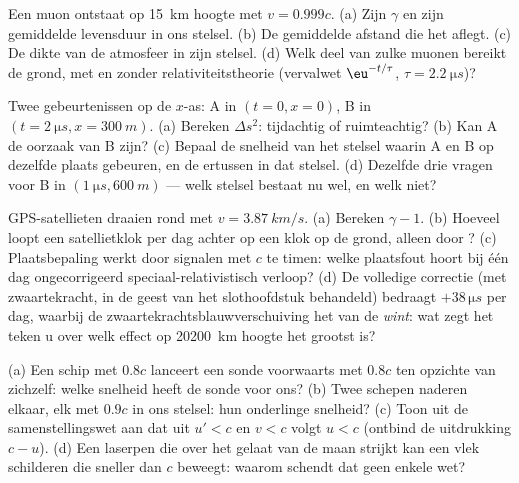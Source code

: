 \begin{exercise}[$\star$]\label{exo:b3:relativistic-kinematics:3}
Een muon ontstaat op \qty{15}{km} hoogte met $v = 0.999c$. (a) Zijn
$\gamma$ en zijn gemiddelde levensduur in ons stelsel. (b) De gemiddelde
afstand die het aflegt. (c) De dikte van de atmosfeer in zijn stelsel.
(d) Welk deel van zulke muonen bereikt de grond, met en zonder
relativiteitstheorie (vervalwet $\eu^{-t/\tau}$, $\tau = \qty{2.2}{\micro s}$)?
\end{exercise}

\begin{exercise}[$\star$]\label{exo:b3:relativistic-kinematics:4}
Twee gebeurtenissen op de $x$-as: A in $(t = 0, x = 0)$, B in $(t =
\qty{2}{\micro s}, x = \qty{300}{m})$. (a) Bereken $\Delta s^2$:
tijdachtig of ruimteachtig? (b) Kan A de oorzaak van B zijn? (c) Bepaal de
snelheid van het stelsel waarin A en B op dezelfde plaats gebeuren, en de
 ertussen in dat stelsel. (d) Dezelfde drie vragen voor B in
$(\qty{1}{\micro s}, \qty{600}{m})$ --- welk stelsel bestaat nu wel, en
welk niet?
\end{exercise}

\begin{exercise}[$\star\star$]\label{exo:b3:relativistic-kinematics:5}
GPS-satellieten draaien rond met $v = \qty{3.87}{km/s}$. (a) Bereken
$\gamma -
1$. (b) Hoeveel loopt een satellietklok per dag achter op een
klok op de grond, alleen door ? (c) Plaatsbepaling werkt door
signalen met $c$ te timen: welke plaatsfout hoort bij één dag ongecorrigeerd
speciaal-relativistisch verloop? (d) De volledige correctie (met
zwaartekracht, in de geest van het slothoofdstuk behandeld) bedraagt
$+38\,\unit{\micro s}$ per dag, waarbij de zwaartekrachtsblauwverschuiving
het van de  \emph{wint}: wat zegt het teken u over welk effect op
\qty{20200}{km} hoogte het grootst is?
\end{exercise}

\begin{exercise}[$\star\star$]\label{exo:b3:relativistic-kinematics:6}
(a) Een schip met $0.8c$ lanceert een sonde voorwaarts met $0.8c$ ten
opzichte van zichzelf: welke snelheid heeft de sonde voor ons? (b) Twee
schepen naderen elkaar, elk met $0.9c$ in ons stelsel: hun onderlinge
snelheid? (c) Toon uit de samenstellingswet aan dat uit $u' < c$ en $v < c$ volgt $u < c$ (ontbind de uitdrukking $c - u$). (d) Een laserpen die
over het gelaat van de maan strijkt kan een vlek schilderen die sneller
dan $c$ beweegt: waarom schendt dat geen enkele wet?
\end{exercise}

